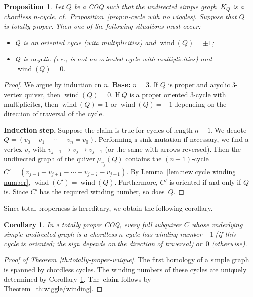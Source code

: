 \documentclass[11pt, letterpaper]{amsart}
\newtheorem{proposition}[theorem]{Proposition}
\newtheorem{corollary}[theorem]{Corollary}
\theoremstyle{definition}
\numberwithin{equation}{section}
\def\wind{{\operatorname{wind}}}
\newcommand\GQ{K_Q}
\begin{document}
\begin{proposition}
\label{prop:cycle proper}
Let $Q$ be a COQ such that the undirected simple graph~$\GQ$ 
is a chordless $n$-cycle, cf.\ Proposition~\ref{prop:n-cycle with no wiggles}.
Suppose that $Q$ is totally proper.
Then one of the following situations must occur:
\begin{itemize}[leftmargin=.2in]
\item 
$Q$ is an oriented cycle (with multiplicities) and $\wind(Q) =\pm 1$; 
\item
$Q$ is acyclic (i.e., is not an oriented cycle with multiplicities) and $\wind(Q)=0$. 
\end{itemize}
\end{proposition}

\begin{proof}
We argue by induction on $n$.
%
\textbf{Base:} $n=3$. 
If $Q$ is proper and acyclic $3$-vertex quiver, then $\wind(Q)=0$.
If $Q$ is a proper oriented 3-cycle with multiplicites, 
then $\wind(Q)=1$ or $\wind(Q)=-1$ depending on the direction of traversal of the cycle. 

\textbf{Induction step.}
Suppose the claim is true for cycles of length $n-1$.
We denote $Q=(v_0 - v_1 -\cdots -v_n=v_0)$. 
Performing a sink mutation if necessary, we find a vertex $v_j$ with $v_{j-1} \rightarrow v_j \rightarrow v_{j+1}$ 
(or the same with arrows reversed).
Then the undirected graph of the quiver $\mu_{v_j}(Q)$ contains the $(n-1)$-cycle $C' = (v_{j-1} - v_{j+1} - \cdots - v_{j-2} - v_{j-1})$. 
By Lemma~\ref{lem:new cycle winding number}, $\wind(C') = \wind(Q)$.
Furthermore, $C'$ is oriented if and only if $Q$ is. 
Since $C'$ has the required winding number, so does~$Q$.  
\end{proof}

Since total properness is hereditary, we obtain the following corollary.

\begin{corollary}
\label{cor:totally-proper-wind}
In a totally proper COQ, every full subquiver $C$ whose underlying simple undirected graph 
is a chordless $n$-cycle 
has winding number $\pm 1$ (if this cycle is oriented; the sign depends on the direction of traversal) or~$0$ (otherwise).
\end{corollary}


\begin{proof}[Proof of Theorem~\ref{th:totally-proper-unique}]
The first homology of a simple graph is spanned by chordless cycles. 
The winding numbers of these cycles are uniquely determined by Corollary~\ref{cor:totally-proper-wind}.
The~claim follows by Theorem~\ref{th:wiggle/winding}. 
\end{proof}
\end{document}
